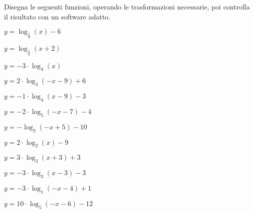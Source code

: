 \begin{esercizio}\label{ese:}
 Disegna le seguenti funzioni, operando le trasformazioni necessarie, poi 
controlla il risultato con un software adatto.
\begin{multicols}{2}
 \begin{enumeratea}
  \item  \(y=  \log_{\frac{1}{4}}\left(x \right) -6\)
  \item  \(y=  \log_{\frac{1}{4}}\left(x+2\right)\)
  \item  \(y=-3 \cdot \log_{4}\left(x\right)\)
  \item  \(y= 2 \cdot \log_{3}\left(-x-9\right) +6\)
  \item  \(y=-1 \cdot \log_{4}\left(x-9\right) -3\)
  \item  \(y=-2 \cdot \log_{5}\left(-x-7\right) -4\)
  \item  \(y= - \log_{3}\left(-x+5\right) -10\)
  \item  \(y= 2 \cdot \log_{2}\left(x \right) -9\)
  \item  \(y= 3 \cdot \log_{3}\left(x+3\right) +3\)
  \item  \(y= -3 \cdot \log_{3}\left(x-3\right) -3\)
  \item  \(y= -3 \cdot \log_{1}\left(-x-4\right) +1\)
  \item  \(y= 10 \cdot \log_{5}\left(-x-6\right) -12\)
 \end{enumeratea}
\end{multicols}
\end{esercizio}


